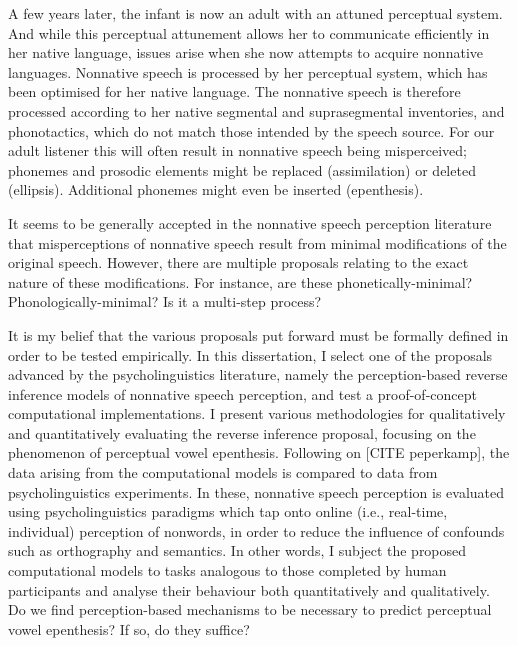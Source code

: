 A few years later, the infant is now an adult with an attuned perceptual system. 
And while this perceptual attunement allows her to communicate efficiently in her native language, issues arise when she now attempts to acquire nonnative languages.
Nonnative speech is processed by her perceptual system, which has been optimised for her native language. The nonnative speech is therefore processed according to her native segmental and suprasegmental inventories, and phonotactics, which do not match those intended by the speech source. 
For our adult listener this will often result in nonnative speech being misperceived; phonemes and prosodic elements might be replaced (assimilation) or deleted (ellipsis). Additional phonemes might even be inserted (epenthesis).


It seems to be generally accepted in the nonnative speech perception literature that misperceptions of nonnative speech result from minimal modifications of the original speech. However, there are multiple proposals relating to the exact nature of these modifications. For instance, are these phonetically-minimal? Phonologically-minimal? Is it a multi-step process?   

It is my belief that the various proposals put forward must be formally defined in order to be tested empirically.  
In this dissertation, I select one of the proposals advanced by the psycholinguistics literature, namely the perception-based reverse inference models of nonnative speech perception, and test a proof-of-concept computational implementations. 
I present various methodologies for qualitatively and quantitatively evaluating the reverse inference proposal, focusing on the phenomenon of perceptual vowel epenthesis. Following on [CITE peperkamp], the data arising from the computational models is compared to data from psycholinguistics experiments. In these, nonnative speech perception is evaluated using psycholinguistics paradigms which tap onto online (i.e., real-time, individual) perception of nonwords, in order to reduce the influence of confounds such as orthography and semantics.
In other words, I subject the proposed computational models to tasks analogous to those completed by human participants and analyse their behaviour both quantitatively and qualitatively. Do we find perception-based mechanisms to be necessary to predict perceptual vowel epenthesis? If so, do they suffice? 

